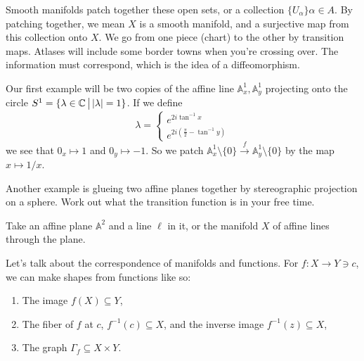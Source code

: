 Smooth manifolds patch together these open sets, or a collection $\{U_{\alpha }\} \alpha \in  A$. By patching together, we mean $X$ is a smooth manifold, and a surjective map from this collection onto $X$. We go from one piece (chart) to the other by transition maps. Atlases will include some border towns when you're crossing over. The information must correspond, which is the idea of a diffeomorphism.
\begin{example}
    Our first example will be two copies of the affine line $\mathbb A_x^1, \mathbb A_y^1$ projecting onto the circle $S^1 = \{\lambda \in  \mathbb{C}  \,\big|\, |\lambda |=1\}  $. If we define  \[
    \lambda = 
    \begin{cases}
        e^{2i \tan ^{-1} x}\\
        e^{2i \left( \frac{\pi}{2}- \tan ^{-1} y \right) }
    \end{cases}
\] we see that $0_x \mapsto 1$ and $0_y \mapsto -1$. So we patch $\mathbb A_x^1 \setminus \{0\} \overset{f}{\to } \mathbb A_y^1 \setminus \{0\} $ by the map $x \mapsto 1 /x$.
\end{example}
\begin{example}
    Another example is glueing two affine planes together by stereographic projection on a sphere. Work out what the transition function is in your free time.
\end{example}
\begin{example}
    Take an affine plane $\mathbb A^2$ and a line $\ell$ in it, or the manifold $X$ of affine lines through the plane.
\end{example}
Let's talk about the correspondence of manifolds and functions. For $f \colon X \to Y\ni c$, we can make shapes from functions like so:
\begin{enumerate}[label=(\arabic*)]
    \item The image $f(X)\subseteq Y$,
    \item The fiber of $f$ at $c$, $f^{-1} (c) \subseteq X$, and the inverse image $f^{-1}(z)\subseteq X$,
    \item The graph $\Gamma_f \subseteq X\times Y$.
\end{enumerate}

